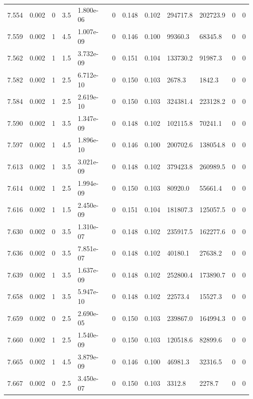 \documentclass[preview]{standalone}
\begin{document}
{{{{{{{{{{{{{{{{{{\begin{tabular}{L{1.2cm}C{1.2cm} C{0.3cm}C{0.5cm} C{1.4cm}C{1.4cm} C{1.4cm}C{1.4cm} C{1.6cm}C{1.6cm} C{1.6cm}C{1.6cm}}
  7.554  &  0.002  & 0     & 3.5 &  1.800e-06  & 0  &  0.148&   0.102& 294717.8 & 202723.9   &  0 & 0  \\ 
  7.559  &  0.002  & 1     & 4.5 &  1.007e-09  & 0  &  0.146&   0.100& 99360.3 & 68345.8   &  0 & 0  \\ 
  7.562  &  0.002  & 1     & 1.5 &  3.732e-09  & 0  &  0.151&   0.104& 133730.2 & 91987.3   &  0 & 0  \\ 
  7.582  &  0.002  & 1     & 2.5 &  6.712e-10  & 0  &  0.150&   0.103& 2678.3 & 1842.3   &  0 & 0  \\ 
  7.584  &  0.002  & 1     & 2.5 &  2.619e-10  & 0  &  0.150&   0.103& 324381.4 & 223128.2   &  0 & 0  \\ 
  7.590  &  0.002  & 1     & 3.5 &  1.347e-09  & 0  &  0.148&   0.102& 102115.8 & 70241.1   &  0 & 0  \\ 
  7.597  &  0.002  & 1     & 4.5 &  1.896e-10  & 0  &  0.146&   0.100& 200702.6 & 138054.8   &  0 & 0  \\ 
  7.613  &  0.002  & 1     & 3.5 &  3.021e-09  & 0  &  0.148&   0.102& 379423.8 & 260989.5   &  0 & 0  \\ 
  7.614  &  0.002  & 1     & 2.5 &  1.994e-09  & 0  &  0.150&   0.103& 80920.0 & 55661.4   &  0 & 0  \\ 
  7.616  &  0.002  & 1     & 1.5 &  2.450e-09  & 0  &  0.151&   0.104& 181807.3 & 125057.5   &  0 & 0  \\ 
  7.630  &  0.002  & 0     & 3.5 &  1.310e-07  & 0  &  0.148&   0.102& 235917.5 & 162277.6   &  0 & 0  \\ 
  7.636  &  0.002  & 0     & 3.5 &  7.851e-07  & 0  &  0.148&   0.102& 40180.1 & 27638.2   &  0 & 0  \\ 
  7.639  &  0.002  & 1     & 3.5 &  1.637e-09  & 0  &  0.148&   0.102& 252800.4 & 173890.7   &  0 & 0  \\ 
  7.658  &  0.002  & 1     & 3.5 &  5.947e-10  & 0  &  0.148&   0.102& 22573.4 & 15527.3   &  0 & 0  \\ 
  7.659  &  0.002  & 0     & 2.5 &  2.690e-05  & 0  &  0.150&   0.103& 239867.0 & 164994.3   &  0 & 0  \\ 
  7.660  &  0.002  & 1     & 2.5 &  1.540e-09  & 0  &  0.150&   0.103& 120518.6 & 82899.6   &  0 & 0  \\ 
  7.665  &  0.002  & 1     & 4.5 &  3.879e-09  & 0  &  0.146&   0.100& 46981.3 & 32316.5   &  0 & 0  \\ 
  7.667  &  0.002  & 0     & 2.5 &  3.450e-07  & 0  &  0.150&   0.103& 3312.8 & 2278.7   &  0 & 0  \\ 

\end{tabular}}}}}}}}}}}}}}}}}}}
\end{document}
